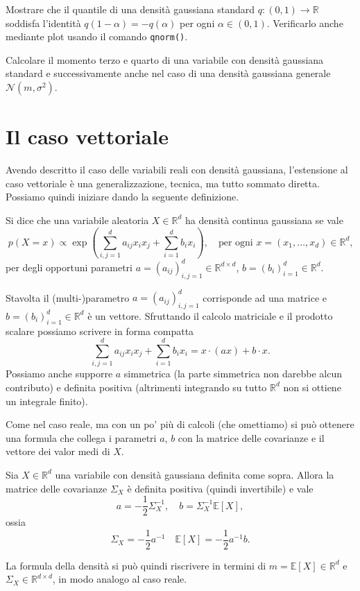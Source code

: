\documentclass[
  italian,
  letterpaper,
]{book}
\newcommand{\bra}[1]{\left( #1 \right)}
\newcommand{\sqa}[1]{\left[ #1 \right]}
\newcommand{\R}{\mathbb{R}}
\newcommand{\E}[1]{\mathbb{E}\sqa{#1}}
\theoremstyle{definition}
\theoremstyle{remark}
\begin{document}
Mostrare che il quantile di una densità gaussiana standard
\(q: (0,1) \to \R\) soddisfa l'identità \(q(1-\alpha) = -q(\alpha)\) per
ogni \(\alpha \in (0,1)\). Verificarlo anche mediante plot usando il
comando \texttt{qnorm()}.

Calcolare il momento terzo e quarto di una variabile con densità
gaussiana standard e successivamente anche nel caso di una densità
gaussiana generale \(\mathcal{N}(m, \sigma^2)\).

\section{Il caso vettoriale}\label{sec-vettoriale}

Avendo descritto il caso delle variabili reali con densità gaussiana,
l'estensione al caso vettoriale è una generalizzazione, tecnica, ma
tutto sommato diretta. Possiamo quindi iniziare dando la seguente
definizione.

Si dice che una variabile aleatoria \(X \in \R^d\) ha densità continua
gaussiana se vale
\[ p(X=x) \propto \exp\bra{ \sum_{i,j=1}^d a_{ij} x_i x_j + \sum_{i=1}^d b_ix_i}, \quad \text{per ogni $x = (x_1, \ldots, x_d) \in \R^d$,}\]
per degli opportuni parametri
\(a = (a_{ij})_{i,j=1}^d \in \R^{d\times d}\),
\(b = (b_i)_{i=1}^d \in \R^d\).

Stavolta il (multi-)parametro \(a = (a_{ij})_{i,j=1}^d\) corrisponde ad
una matrice e \(b = (b_i)_{i=1}^d \in \R^d\) è un vettore. Sfruttando il
calcolo matriciale e il prodotto scalare possiamo scrivere in forma
compatta
\[\sum_{i,j=1}^d a_{ij} x_i x_j + \sum_{i=1}^d b_ix_i =  x \cdot (ax) + b \cdot x.\]
Possiamo anche supporre \(a\) simmetrica (la parte simmetrica non
darebbe alcun contributo) e definita positiva (altrimenti integrando su
tutto \(\R^d\) non si ottiene un integrale finito).

Come nel caso reale, ma con un po' più di calcoli (che omettiamo) si può
ottenere una formula che collega i parametri \(a\), \(b\) con la matrice
delle covarianze e il vettore dei valor medi di \(X\).

Sia \(X \in \R^d\) una variabile con densità gaussiana definita come
sopra. Allora la matrice delle covarianze \(\Sigma_X\) è definita
positiva (quindi invertibile) e vale
\[ a = -\frac{1}{2}\Sigma_X^{-1}, \quad b = \Sigma_X^{-1}\E{X},\] ossia
\[ \Sigma_X =  -\frac{1}{2} a^{-1} \quad \E{X} = -\frac 1 2 a^{-1} b .\]

La formula della densità si può quindi riscrivere in termini di
\(m =\E{X} \in \R^d\) e \(\Sigma_X \in \R^{d\times d}\), in modo analogo
al caso reale.
\end{document}
